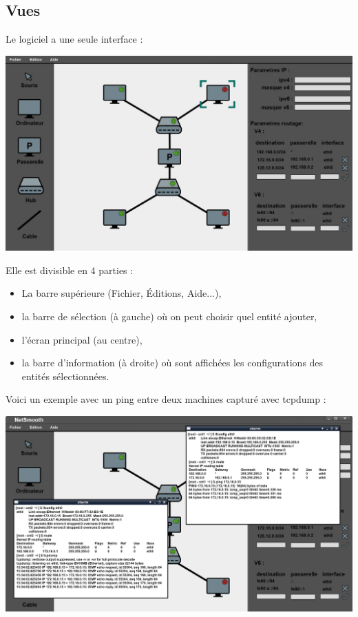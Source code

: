 \documentclass[a4paper]{article}
\begin{document}
\subsection{Vues}
Le logiciel a une seule interface : 
\begin{center}
\includegraphics[scale=0.25]{bulto.png}
\end{center}
Elle est divisible en 4 parties : 
\begin{itemize}
\item La barre supérieure (Fichier, Éditions, Aide...),
\item la barre de sélection (à gauche) où on peut choisir quel entité ajouter,
\item l'écran principal (au centre),
\item la barre d'information (à droite) où sont affichées les configurations des entités sélectionnées.
\end{itemize}

Voici un exemple avec un ping entre deux machines capturé avec tcpdump :
\vspace{16\baselineskip}
\begin{center}
\includegraphics[scale=0.25]{exemple_netsmooth.png}
\end{center}
\end{document}

